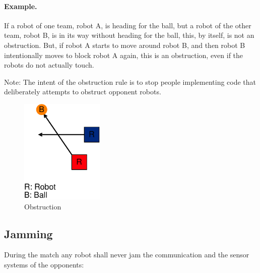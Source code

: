 \documentclass[12pt]{article}
\begin{document}
\paragraph{Example.} If a robot of one team, robot A, is heading for the ball, but a robot of the other team, robot B, is in its way without heading for the ball, this, by itself, is not an obstruction. But, if robot A starts to move around robot B, and then robot B intentionally moves to block robot A again, this is an obstruction, even if the robots do not actually touch.

Note: The intent of the obstruction rule is to stop people implementing code that deliberately attempts to obstruct opponent robots.

\begin{figure}[t]
\centerline{\includegraphics[height=5cm]{figs/obstruction}}
\caption{Obstruction}\label{fig:obstruction}
\end{figure}

\subsection{Jamming}

During the match any robot shall never jam the communication and the sensor systems of the opponents:
\end{document}
